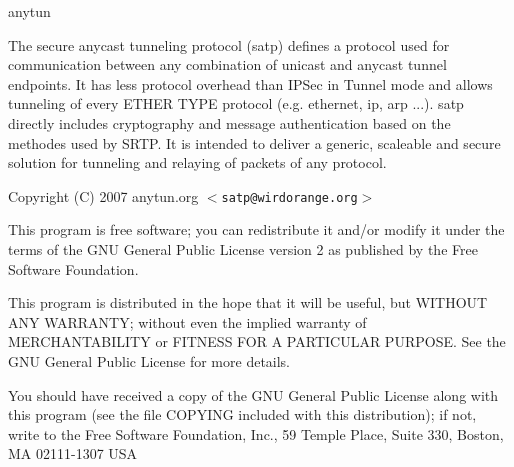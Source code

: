 anytun

The secure anycast tunneling protocol (satp) defines a protocol used for communication between any combination of unicast and anycast tunnel endpoints. It has less protocol overhead than IPSec in Tunnel mode and allows tunneling of every ETHER TYPE protocol (e.g. ethernet, ip, arp ...). satp directly includes cryptography and message authentication based on the methodes used by SRTP. It is intended to deliver a generic, scaleable and secure solution for tunneling and relaying of packets of any protocol.

Copyright (C) 2007 anytun.org $<${\tt satp@wirdorange.org}$>$

This program is free software; you can redistribute it and/or modify it under the terms of the GNU General Public License version 2 as published by the Free Software Foundation.

This program is distributed in the hope that it will be useful, but WITHOUT ANY WARRANTY; without even the implied warranty of MERCHANTABILITY or FITNESS FOR A PARTICULAR PURPOSE. See the GNU General Public License for more details.

You should have received a copy of the GNU General Public License along with this program (see the file COPYING included with this distribution); if not, write to the Free Software Foundation, Inc., 59 Temple Place, Suite 330, Boston, MA 02111-1307 USA 